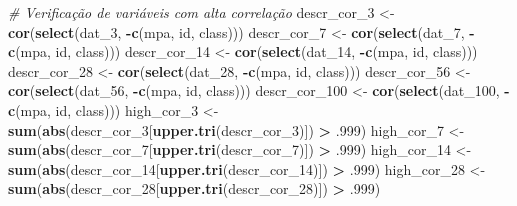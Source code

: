 \documentclass[]{article}
\newenvironment{Shaded}{\begin{snugshade}}{\end{snugshade}}
\newcommand{\CommentTok}[1]{\textcolor[rgb]{0.56,0.35,0.01}{\textit{#1}}}
\newcommand{\DecValTok}[1]{\textcolor[rgb]{0.00,0.00,0.81}{#1}}
\newcommand{\FloatTok}[1]{\textcolor[rgb]{0.00,0.00,0.81}{#1}}
\newcommand{\KeywordTok}[1]{\textcolor[rgb]{0.13,0.29,0.53}{\textbf{#1}}}
\newcommand{\NormalTok}[1]{#1}
\newcommand{\OperatorTok}[1]{\textcolor[rgb]{0.81,0.36,0.00}{\textbf{#1}}}
\newcommand{\StringTok}[1]{\textcolor[rgb]{0.31,0.60,0.02}{#1}}
\begin{document}
\label{show-cors}

\begin{Shaded}
\begin{Highlighting}[]
\CommentTok{# Verificação de variáveis com alta correlação}
\NormalTok{descr_cor_}\DecValTok{3}\NormalTok{ <-}\StringTok{ }\KeywordTok{cor}\NormalTok{(}\KeywordTok{select}\NormalTok{(dat_}\DecValTok{3}\NormalTok{, }\OperatorTok{-}\KeywordTok{c}\NormalTok{(mpa, id, class)))}
\NormalTok{descr_cor_}\DecValTok{7}\NormalTok{ <-}\StringTok{ }\KeywordTok{cor}\NormalTok{(}\KeywordTok{select}\NormalTok{(dat_}\DecValTok{7}\NormalTok{, }\OperatorTok{-}\KeywordTok{c}\NormalTok{(mpa, id, class)))}
\NormalTok{descr_cor_}\DecValTok{14}\NormalTok{ <-}\StringTok{ }\KeywordTok{cor}\NormalTok{(}\KeywordTok{select}\NormalTok{(dat_}\DecValTok{14}\NormalTok{, }\OperatorTok{-}\KeywordTok{c}\NormalTok{(mpa, id, class)))}
\NormalTok{descr_cor_}\DecValTok{28}\NormalTok{ <-}\StringTok{ }\KeywordTok{cor}\NormalTok{(}\KeywordTok{select}\NormalTok{(dat_}\DecValTok{28}\NormalTok{, }\OperatorTok{-}\KeywordTok{c}\NormalTok{(mpa, id, class)))}
\NormalTok{descr_cor_}\DecValTok{56}\NormalTok{ <-}\StringTok{ }\KeywordTok{cor}\NormalTok{(}\KeywordTok{select}\NormalTok{(dat_}\DecValTok{56}\NormalTok{, }\OperatorTok{-}\KeywordTok{c}\NormalTok{(mpa, id, class)))}
\NormalTok{descr_cor_}\DecValTok{100}\NormalTok{ <-}\StringTok{ }\KeywordTok{cor}\NormalTok{(}\KeywordTok{select}\NormalTok{(dat_}\DecValTok{100}\NormalTok{, }\OperatorTok{-}\KeywordTok{c}\NormalTok{(mpa, id, class)))}
\NormalTok{high_cor_}\DecValTok{3}\NormalTok{ <-}\StringTok{ }\KeywordTok{sum}\NormalTok{(}\KeywordTok{abs}\NormalTok{(descr_cor_}\DecValTok{3}\NormalTok{[}\KeywordTok{upper.tri}\NormalTok{(descr_cor_}\DecValTok{3}\NormalTok{)]) }\OperatorTok{>}\StringTok{ }\FloatTok{.999}\NormalTok{)}
\NormalTok{high_cor_}\DecValTok{7}\NormalTok{ <-}\StringTok{ }\KeywordTok{sum}\NormalTok{(}\KeywordTok{abs}\NormalTok{(descr_cor_}\DecValTok{7}\NormalTok{[}\KeywordTok{upper.tri}\NormalTok{(descr_cor_}\DecValTok{7}\NormalTok{)]) }\OperatorTok{>}\StringTok{ }\FloatTok{.999}\NormalTok{)}
\NormalTok{high_cor_}\DecValTok{14}\NormalTok{ <-}\StringTok{ }\KeywordTok{sum}\NormalTok{(}\KeywordTok{abs}\NormalTok{(descr_cor_}\DecValTok{14}\NormalTok{[}\KeywordTok{upper.tri}\NormalTok{(descr_cor_}\DecValTok{14}\NormalTok{)]) }\OperatorTok{>}\StringTok{ }\FloatTok{.999}\NormalTok{)}
\NormalTok{high_cor_}\DecValTok{28}\NormalTok{ <-}\StringTok{ }\KeywordTok{sum}\NormalTok{(}\KeywordTok{abs}\NormalTok{(descr_cor_}\DecValTok{28}\NormalTok{[}\KeywordTok{upper.tri}\NormalTok{(descr_cor_}\DecValTok{28}\NormalTok{)]) }\OperatorTok{>}\StringTok{ }\FloatTok{.999}\NormalTok{)}

\end{Highlighting}
\end{Shaded}
\end{document}
